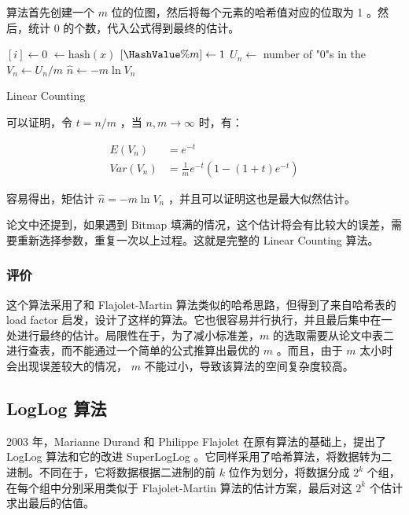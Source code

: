\documentclass{ctexart}
\begin{document}
    算法首先创建一个 $m$ 位的位图，然后将每个元素的哈希值对应的位取为 1 。然后，统计 0 的个数，代入公式得到最终的估计。

    \begin{algorithm}
        \BlankLine
         {
            \Bitmap $[i] \leftarrow 0$\;
        }
         {
            \HashValue$ \leftarrow \mathrm{hash}(x)$\;
            \Bitmap$[\HashValue \% m] \leftarrow 1$\;
        }
        $U_n \leftarrow $ number of "0"s in the \Bitmap \;
        $V_n \leftarrow U_n/m$ \;
        $\hat{n} \leftarrow -m\ln{V_n}$ \;
        \caption{Linear Counting}
    \end{algorithm}

    可以证明\cite{Whang:1990ei}，令 $t = n / m$ ，当 $n, m \to \infty$ 时，有：

    \begin{align*}
        E(V_n) &= e^{-t} \\
        Var(V_n) &= \frac1me^{-t}(1-(1+t)e^{-t})
    \end{align*}

    容易得出，矩估计 $\hat{n} = -m\ln{V_n}$ ，并且可以证明这也是最大似然估计。

    论文中还提到，如果遇到 Bitmap 填满的情况，这个估计将会有比较大的误差，需要重新选择参数，重复一次以上过程。这就是完整的 Linear Counting 算法。

\subsubsection{评价}
    这个算法采用了和 Flajolet-Martin 算法类似的哈希思路，但得到了来自哈希表的 load factor 启发，设计了这样的算法。它也很容易并行执行，并且最后集中在一处进行最终的估计。局限性在于，为了减小标准差，$m$ 的选取需要从论文中表二进行查表，而不能通过一个简单的公式推算出最优的 $m$ 。而且，由于 $m$ 太小时会出现误差较大的情况， $m$ 不能过小，导致该算法的空间复杂度较高。

\subsection{LogLog 算法 \cite{Durand:2003je}}
    2003 年，Marianne Durand 和 Philippe Flajolet 在原有算法的基础上，提出了 LogLog 算法和它的改进 SuperLogLog 。它同样采用了哈希算法，将数据转为二进制。不同在于，它将数据根据二进制的前 $k$ 位作为划分，将数据分成 $2^k$ 个组，在每个组中分别采用类似于 Flajolet-Martin 算法的估计方案，最后对这 $2^k$ 个估计求出最后的估值。
\end{document}
